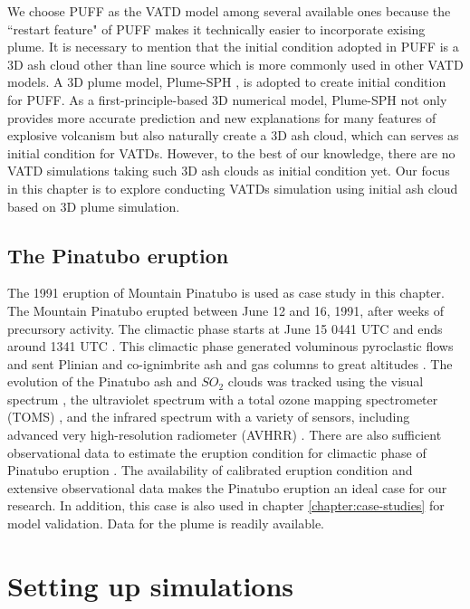 We choose PUFF \citep{searcy1998puff} as the VATD model among several available ones \citep[e.g.][]{searcy1998puff,schwaiger2012ash3d} because the ``restart feature" of PUFF makes it technically easier to incorporate exising plume.
It is necessary to mention that the initial condition adopted in PUFF is a 3D ash cloud other than line source which is more commonly used in other VATD models.
A 3D plume model, Plume-SPH \citep{gmd-2017-119}, is adopted to create initial condition for PUFF. As a first-principle-based 3D numerical model, Plume-SPH not only provides more accurate prediction and new explanations for many features of explosive volcanism but also naturally create a 3D ash cloud, which can   serves as initial condition for VATDs. However, to the best of our knowledge, there are no VATD simulations taking such 3D ash clouds as initial condition yet. Our focus in this chapter is to explore conducting VATDs simulation using initial ash cloud based on 3D plume simulation.

\subsection{The Pinatubo eruption}

The 1991 eruption of Mountain Pinatubo is used as case study in this chapter. The Mountain Pinatubo erupted between June 12 and 16, 1991, after weeks of precursory activity. The climactic phase starts at June 15 0441 UTC and ends around 1341 UTC \citep{holasek1996satellite}. This climactic phase generated voluminous pyroclastic flows and sent Plinian and co-ignimbrite ash and gas columns to great altitudes \citep{scott1996pyroclastic}. The evolution of the Pinatubo ash and $SO_2$ clouds was tracked using the visual spectrum \citep{holasek1996satellite}, the ultraviolet spectrum with a total ozone mapping spectrometer (TOMS) \citep{guo2004re}, and the infrared spectrum with a variety of sensors, including advanced very high-resolution radiometer (AVHRR) \citep{guo2004particles}. There are also sufficient observational data to estimate the eruption condition for climactic phase of Pinatubo eruption \citep{suzuki2009three}. The availability of calibrated eruption condition and extensive observational data makes the Pinatubo eruption an ideal case for our research. In addition, this case is also used in chapter \ref{chapter:case-studies} for model validation. Data for the plume is readily available.

\section{Setting up simulations} \label{sec:Methodology}

